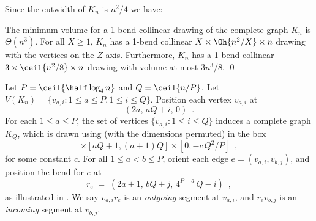 \documentclass[10pt,twocolumn]{article}
\begin{document}
%
%

Since the cutwidth of $K_n$ is $n^2/4$ we have:

\begin{corollary}
The minimum volume for a 1-bend collinear drawing of the complete graph $K_n$ 
is $\Theta(n^3)$. For all $X\geq1$, $K_n$  has a 1-bend collinear 
$X\times\Oh{n^2/X}\times n$ drawing with the vertices on the $Z$-axis.
Furthermore, $K_n$ has a 1-bend collinear  
$3\times\ceil{n^2/8}\times n$ drawing with volume at most $3n^3/8$.
\qed
\end{corollary}


Let $P=\ceil{\half\log_4n}$ and $Q=\ceil{n/P}$. Let $V(K_n)= \{ v_{a,i} : 1\leq
a\leq P, 1\leq i\leq Q\}$. Position each vertex $v_{a,i}$ at 
\begin{equation*}
(2a,\,aQ+i,\,0)\enspace.
\end{equation*}
For each $1\leq a\leq P$, the set of vertices $\{v_{a,i}:1\leq i\leq Q\}$
induces a complete graph $K_Q$, which is drawn 
using  (with the dimensions permuted) 
in  the box
\begin{equation*}
[2a,2a+P]\times[aQ+1,(a+1)Q]\times[0,-c\,Q^2/P]\enspace,
\end{equation*}
for some constant $c$. For all $1\leq a<b\leq P$,  orient each edge
$e=(v_{a,i},v_{b,j})$,  and position the bend for $e$ at 
\begin{equation*}
r_e\;=\;(2a+1,\,bQ+j,\,4^{P-a}\, Q-i)\enspace,
\end{equation*}
as illustrated in . We say $v_{a,i}r_e$ is an
\emph{outgoing} segment at $v_{a,i}$, and $r_ev_{b,j}$ is an \emph{incoming}
segment at $v_{b,j}$.
\end{document}
